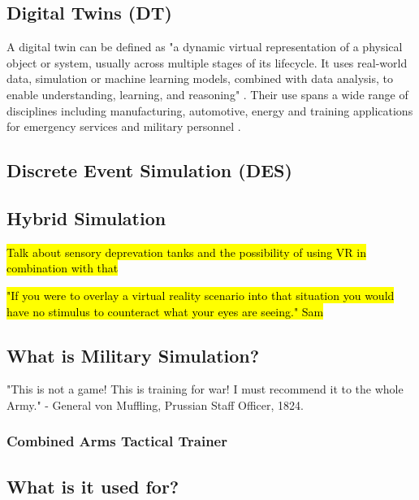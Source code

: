 \documentclass{article}
\begin{document}
\subsection{Digital Twins (DT)}

A digital twin can be defined as "a dynamic virtual representation of a physical object or system, usually across multiple stages of its lifecycle. It uses real-world data, simulation or machine learning models, combined with data analysis, to enable understanding, learning, and reasoning" \cite{stanford2019digital}. Their use spans a wide range of disciplines including manufacturing, automotive, energy \cite{PYLIANIDIS2021105942} and training applications for emergency services \cite{ScientificReports1} and military personnel \cite{9345490}.

\subsection{Discrete Event Simulation (DES)}

\subsection{Hybrid Simulation}


\hl{Talk about sensory deprevation tanks and the possibility of using VR in combination with that}

\hl{"If you were to overlay a virtual reality scenario into that situation you would have no stimulus to counteract what your eyes are seeing." Sam}

\subsection{What is Military Simulation?}

"This is not a game! This is training for war! I must recommend it to the whole Army." - General von Muffling, Prussian Staff Officer, 1824.

\subsubsection{Combined Arms Tactical Trainer}




\subsection{What is it used for?}
\end{document}

